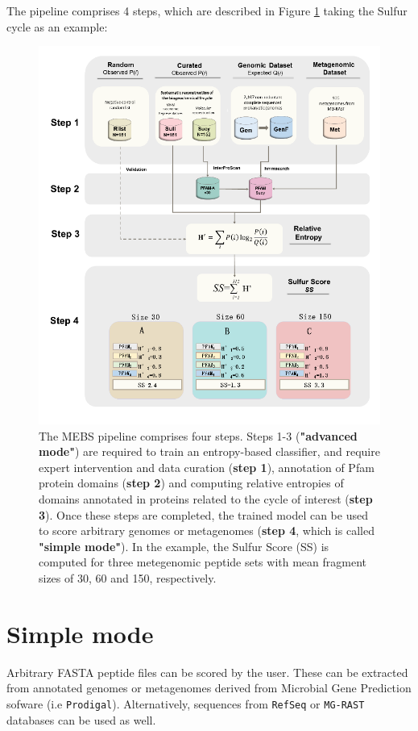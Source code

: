 \documentclass[12pt]{report}
\begin{document}
The pipeline comprises 4 steps, which are described in Figure \ref{fig:pipeline} taking the Sulfur cycle as an example:
\begin{figure}[H]
  \centering
    \includegraphics[scale=0.8]{flowchart.png}
    \caption{The MEBS pipeline comprises four steps. Steps 1-3 (\textbf{"advanced mode"}) are required to train an entropy-based classifier, and require expert intervention and data curation (\textbf{step 1}), annotation of Pfam protein domains (\textbf{step 2}) and computing relative entropies of domains annotated in proteins related to the cycle of interest (\textbf{step 3}). Once these steps are completed, the trained model can be used to score arbitrary genomes or metagenomes (\textbf{step 4}, which is called \textbf{"simple mode"}). In the example, the Sulfur Score (SS) is computed for three metegenomic peptide sets with mean fragment sizes of 30, 60 and 150, respectively.}
        \label{fig:pipeline}
\end{figure}

\section{Simple mode}
\label{simple_mod}
Arbitrary FASTA peptide files can be scored by the user. These can be extracted from annotated genomes or metagenomes derived from Microbial Gene Prediction sofware (i.e \texttt{Prodigal}). Alternatively, sequences from \texttt{RefSeq} or \texttt{MG-RAST} databases can be used as well. 
\end{document}
